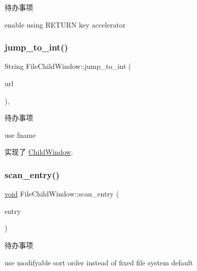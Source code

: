 \begin{DoxyRefDesc}{待办事项}
\item[\hyperlink{todo__todo000030}{待办事项}]enable using R\+E\+T\+U\+RN key accelerator \end{DoxyRefDesc}
\mbox{\label{struct_file_child_window_aed746ad1a9c8ebb3d07032b111f402bd}} 
\subsubsection{\texorpdfstring{jump\+\_\+to\+\_\+int()}{jump\_to\_int()}}
{\footnotesize\ttfamily String File\+Child\+Window\+::jump\+\_\+to\+\_\+int (\begin{DoxyParamCaption}\item[{L\+P\+C\+T\+S\+TR}]{url }\end{DoxyParamCaption})\hspace{0.3cm}{\ttfamily [protected]}, {\ttfamily [virtual]}}

\begin{DoxyRefDesc}{待办事项}
\item[\hyperlink{todo__todo000032}{待办事项}]use fname \end{DoxyRefDesc}


实现了 \hyperlink{struct_child_window}{Child\+Window}.

\mbox{\label{struct_file_child_window_a6966bc5ed4f9a7dec37670237ea871e9}} 
\subsubsection{\texorpdfstring{scan\+\_\+entry()}{scan\_entry()}}
{\footnotesize\ttfamily \hyperlink{interfacevoid}{void} File\+Child\+Window\+::scan\+\_\+entry (\begin{DoxyParamCaption}\item[{\hyperlink{struct_entry}{Entry} $\ast$}]{entry }\end{DoxyParamCaption})\hspace{0.3cm}{\ttfamily [protected]}}

\begin{DoxyRefDesc}{待办事项}
\item[\hyperlink{todo__todo000031}{待办事项}]use modifyable sort order instead of fixed file system default \end{DoxyRefDesc}
\mbox{\label{struct_file_child_window_a150ccb0046f5e847a6129d33a3843da7}} 

